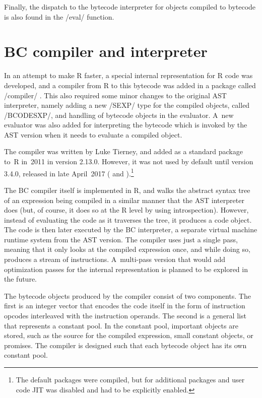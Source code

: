 {Finally, the dispatch to the bytecode interpreter for objects compiled to bytecode is also found in the \cinline/eval/ function.


\section{BC compiler and interpreter}

In an attempt to make R faster, a special internal representation for R code was developed, and a compiler from R to this bytecode was added in a package called \rinline/compiler/ \autocite{compiler}. This also required some minor changes to the original AST interpreter, namely adding a new \cinline/SEXP/ type for the compiled objects, called \cinline/BCODESXP/, and handling of bytecode objects in the evaluator. A~new evaluator was also added for interpreting the bytecode which is invoked by the AST version when it needs to evaluate a compiled object.

The compiler was written by Luke Tierney, and added as a standard package to~R in~2011 in version 2.13.0. However, it was not used by default until version 3.4.0, released in late April~2017 (\autocite{announce2011} and \autocite{announce2017}).\footnote{The default packages were compiled, but for additional packages and user code JIT was disabled and had to be explicitly enabled.}

The BC compiler itself is implemented in R, and walks the abstract syntax tree of an expression being compiled in a similar manner that the AST interpreter does (but, of course, it does so at the R level by using introspection). However, instead of evaluating the code as it traverses the tree, it produces a code object. The code is then later executed by the BC interpreter, a separate virtual machine runtime system from the AST version. The compiler uses just a single pass, meaning that it only looks at the compiled expression once, and while doing so, produces a stream of instructions. A~multi-pass version that would add optimization passes for the internal representation is planned to be explored in the future.

The bytecode objects produced by the compiler consist of two components. The first is an integer vector that encodes the code itself in the form of instruction opcodes interleaved with the instruction operands. The second is a general list that represents a constant pool. In the constant pool, important objects are stored, such as the source for the compiled expression, small constant objects, or promises. The compiler is designed such that each bytecode object has its own constant pool.

}
